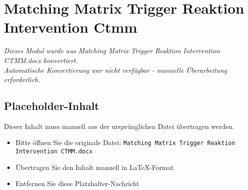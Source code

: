 
\section{Matching Matrix Trigger Reaktion Intervention Ctmm}
\label{sec:matching-matrix-trigger-reaktion-intervention-ctmm}

\begin{center}
\textit{Dieses Modul wurde aus Matching Matrix Trigger Reaktion Intervention CTMM.docx konvertiert.\\
Automatische Konvertierung war nicht verfügbar - manuelle Überarbeitung erforderlich.}
\end{center}


\subsection{Placeholder-Inhalt}

Dieser Inhalt muss manuell aus der ursprünglichen Datei übertragen werden.

\begin{itemize}
\item Bitte öffnen Sie die originale Datei: \texttt{Matching Matrix Trigger Reaktion Intervention CTMM.docx}
\item Übertragen Sie den Inhalt manuell in LaTeX-Format
\item Entfernen Sie diese Platzhalter-Nachricht
\end{itemize}
